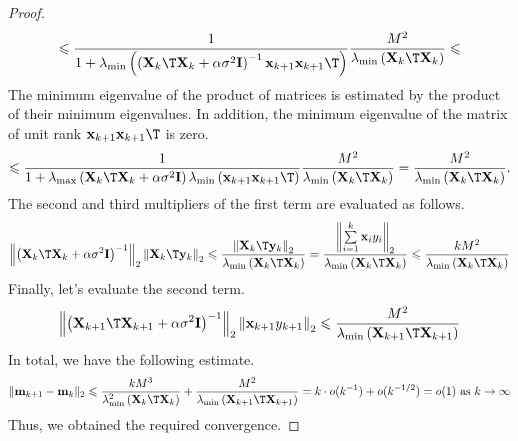 \documentclass[runningheads]{llncs}
\begin{document}
\begin{proof}
    \[ \leqslant \dfrac{1}{1 + \lambda_{\min}\left(\left( \mathbf{X}_k\T \mathbf{X}_k + \alpha \sigma^2 \mathbf{I} \right)^{-1} \mathbf{x}_{k+1} \mathbf{x}_{k+1}\T \right)} \dfrac{M^2}{\lambda_{\min}\left( \mathbf{X}_k\T \mathbf{X}_k \right)} \leqslant \]
    The minimum eigenvalue of the product of matrices is estimated by the product of their minimum eigenvalues. In addition, the minimum eigenvalue of the matrix of unit rank $\mathbf{x}_{k+1}\mathbf{x}_{k+1}\T$ is zero.
    \[ \leqslant \dfrac{1}{1 + \lambda_{\max}\left( \mathbf{X}_k\T \mathbf{X}_k + \alpha \sigma^2 \mathbf{I} \right) \lambda_{\min}\left( \mathbf{x}_{k+1} \mathbf{x}_{k+1}\T \right)} \dfrac{M^2}{\lambda_{\min}\left( \mathbf{X}_k\T \mathbf{X}_k \right)} = \dfrac{M^2}{\lambda_{\min}\left( \mathbf{X}_k\T \mathbf{X}_k \right)}. \]
The second and third multipliers of the first term are evaluated as follows.
    \[ \left\| \left( \mathbf{X}_k\T \mathbf{X}_k + \alpha \sigma^2 \mathbf{I} \right)^{-1} \right\|_2 \left\| \mathbf{X}_k\T \mathbf{y}_k \right\|_2 \leqslant \dfrac{\left\| \mathbf{X}_k\T \mathbf{y}_k \right\|_2}{\lambda_{\min}\left( \mathbf{X}_k\T \mathbf{X}_k \right)} = \dfrac{\left\| \sum\limits_{i=1}^{k} \mathbf{x}_i y_i \right\|_2}{\lambda_{\min}\left( \mathbf{X}_k\T \mathbf{X}_k \right)} \leqslant \dfrac{k M^2}{\lambda_{\min}\left( \mathbf{X}_k\T \mathbf{X}_k \right)} \]
    Finally, let's evaluate the second term.
    \[ \left\| \left( \mathbf{X}_{k+1}\T \mathbf{X}_{k+1} + \alpha \sigma^2 \mathbf{I} \right)^{-1} \right\|_2 \left\| \mathbf{x}_{k+1} y_{k+1} \right\|_2 \leqslant \dfrac{M^2}{\lambda_{\min}\left( \mathbf{X}_{k+1}\T \mathbf{X}_{k+1} \right)} \]
    In total, we have the following estimate.
    \[ \| \mathbf{m}_{k+1} - \mathbf{m}_k \|_2 \leqslant \dfrac{k M^3}{\lambda_{\min}^2\left( \mathbf{X}_k\T \mathbf{X}_k \right)} + \dfrac{M^2}{\lambda_{\min}\left( \mathbf{X}_{k+1}\T \mathbf{X}_{k+1} \right)} = k\cdot o(k^{-1}) + o(k^{-1/2}) = o(1) \text{ as } k\to \infty\]
    Thus, we obtained the required convergence.
\end{proof}
\end{document}
